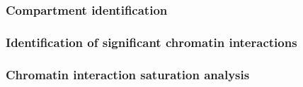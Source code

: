 \subsubsection{Compartment identification}


\subsubsection{Identification of significant chromatin interactions}



\subsubsection{Chromatin interaction saturation analysis}


